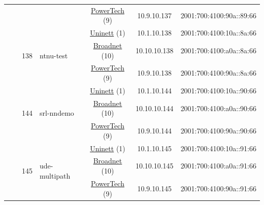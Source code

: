 \begin{small}
\begin{center}
\begin{longtable}{|c|c|c|c|c|c|c|c|}
  &  &  &  & \multicolumn{2}{|c|}{\tiny{\href{http://www.powertech.no}{PowerTech} (9)}} & \tiny{10.9.10.137} & \tiny{2001:700:4100:90a::89:66} \\* \cline{3-3}\cline{4-4}\cline{5-5}\cline{6-6}\cline{7-7}\cline{8-8}
  &  & \multirow{3}{*}{\tiny{138}} & \multicolumn{1}{|l|}{\multirow{3}{*}{\tiny{ntnu-test}}} & \multicolumn{2}{|c|}{\tiny{\href{https://www.uninett.no}{Uninett} (1)}} & \tiny{10.1.10.138} & \tiny{2001:700:4100:10a::8a:66} \\* \cline{5-5}\cline{6-6}\cline{7-7}\cline{8-8}
  &  &  &  & \multicolumn{2}{|c|}{\tiny{\href{https://www.broadnet.no}{Broadnet} (10)}} & \tiny{10.10.10.138} & \tiny{2001:700:4100:a0a::8a:66} \\* \cline{5-5}\cline{6-6}\cline{7-7}\cline{8-8}
  &  &  &  & \multicolumn{2}{|c|}{\tiny{\href{http://www.powertech.no}{PowerTech} (9)}} & \tiny{10.9.10.138} & \tiny{2001:700:4100:90a::8a:66} \\* \cline{3-3}\cline{4-4}\cline{5-5}\cline{6-6}\cline{7-7}\cline{8-8}
  &  & \multirow{3}{*}{\tiny{144}} & \multicolumn{1}{|l|}{\multirow{3}{*}{\tiny{srl-nndemo}}} & \multicolumn{2}{|c|}{\tiny{\href{https://www.uninett.no}{Uninett} (1)}} & \tiny{10.1.10.144} & \tiny{2001:700:4100:10a::90:66} \\* \cline{5-5}\cline{6-6}\cline{7-7}\cline{8-8}
  &  &  &  & \multicolumn{2}{|c|}{\tiny{\href{https://www.broadnet.no}{Broadnet} (10)}} & \tiny{10.10.10.144} & \tiny{2001:700:4100:a0a::90:66} \\* \cline{5-5}\cline{6-6}\cline{7-7}\cline{8-8}
  &  &  &  & \multicolumn{2}{|c|}{\tiny{\href{http://www.powertech.no}{PowerTech} (9)}} & \tiny{10.9.10.144} & \tiny{2001:700:4100:90a::90:66} \\* \cline{3-3}\cline{4-4}\cline{5-5}\cline{6-6}\cline{7-7}\cline{8-8}
  &  & \multirow{3}{*}{\tiny{145}} & \multicolumn{1}{|l|}{\multirow{3}{*}{\tiny{ude-multipath}}} & \multicolumn{2}{|c|}{\tiny{\href{https://www.uninett.no}{Uninett} (1)}} & \tiny{10.1.10.145} & \tiny{2001:700:4100:10a::91:66} \\* \cline{5-5}\cline{6-6}\cline{7-7}\cline{8-8}
  &  &  &  & \multicolumn{2}{|c|}{\tiny{\href{https://www.broadnet.no}{Broadnet} (10)}} & \tiny{10.10.10.145} & \tiny{2001:700:4100:a0a::91:66} \\* \cline{5-5}\cline{6-6}\cline{7-7}\cline{8-8}
  &  &  &  & \multicolumn{2}{|c|}{\tiny{\href{http://www.powertech.no}{PowerTech} (9)}} & \tiny{10.9.10.145} & \tiny{2001:700:4100:90a::91:66} \\* \cline{3-3}\cline{4-4}\cline{5-5}\cline{6-6}\cline{7-7}\cline{8-8}

\end{longtable}
\end{center}
\end{small}
